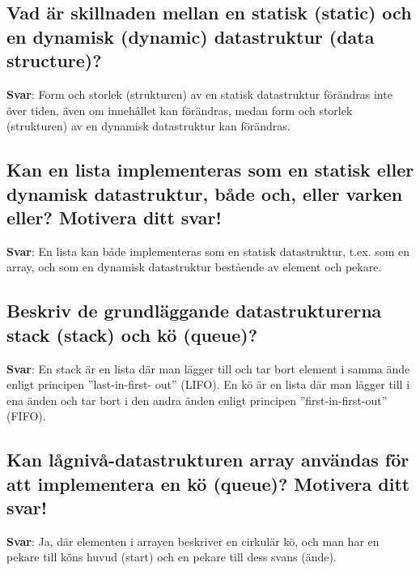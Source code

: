 \documentclass[a4paper,11pt,oneside]{article}
\begin{document}
\begin{sloppypar}
\subsection{Vad \"ar skillnaden mellan en statisk (static) och en dynamisk (dynamic) datastruktur (data structure)?}

\label{q:256:sa:sv:True}

\textbf{Svar}: Form och storlek (strukturen) av en statisk datastruktur f\"or\"andras inte \"over tiden, \"aven om inneh\r{a}llet kan f\"or\"andras, medan form och storlek (strukturen) av en dynamisk datastruktur kan f\"or\"andras.



\subsection{Kan en lista implementeras som en statisk eller dynamisk datastruktur, b\r{a}de och, eller varken eller? Motivera ditt svar!}

\label{q:257:sa:sv:True}

\textbf{Svar}: En lista kan b\r{a}de implementeras som en statisk datastruktur, t.ex. som en array, och som en dynamisk datastruktur best\r{a}ende av element och pekare.



\subsection{Beskriv de grundl\"aggande datastrukturerna stack (stack) och k\"o (queue)?}

\label{q:258:sa:sv:True}

\textbf{Svar}: En stack \"ar en lista d\"ar man l\"agger till och tar bort element i samma \"ande enligt principen {\textquotedblright}last-in-first- out{\textquotedblright} (LIFO). En k\"o \"ar en lista d\"ar man l\"agger till i ena \"anden och tar bort i den andra \"anden enligt principen {\textquotedblright}first-in-first-out{\textquotedblright} (FIFO).



\subsection{Kan l\r{a}gniv\r{a}-datastrukturen array anv\"andas f\"or att implementera en k\"o (queue)? Motivera ditt svar!}

\label{q:259:sa:sv:True}

\textbf{Svar}: Ja, d\"ar elementen i arrayen beskriver en cirkul\"ar k\"o, och man har en pekare till k\"ons huvud (start) och en pekare till dess svans (\"ande).




\end{sloppypar}
\end{document}
